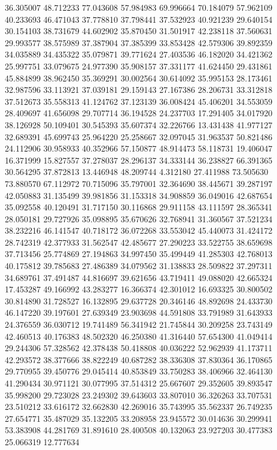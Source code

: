 36.305007
48.712233
77.043608
57.984983
69.996664
70.184079
57.962109
40.233693
46.471043
37.778810
37.798441
37.532923
40.921239
29.640154
30.154103
38.731679
44.602902
35.870450
31.501917
42.238118
37.560631
29.993577
38.575989
37.387904
37.385399
33.853428
42.579306
39.892359
34.035889
34.435322
35.079871
39.771624
27.403536
46.182020
34.421362
25.997751
33.079675
24.977390
35.908157
37.331177
41.624450
29.431861
45.884899
38.962450
35.369291
30.002564
30.614092
35.995153
28.173461
32.987596
33.113921
37.039181
29.159143
27.167386
28.206731
33.312818
37.512673
35.558313
41.124762
37.123139
36.008424
45.406201
34.553059
28.409697
41.656098
29.707714
36.194528
24.237703
17.291405
34.017920
38.126928
50.109401
30.545393
35.607374
32.226766
13.431438
41.977127
32.689391
45.699743
25.964220
25.258667
32.097045
31.963537
50.821486
24.112906
30.958933
40.352966
57.150877
48.914473
58.118731
19.406047
16.371999
15.827557
37.278037
28.296137
34.333144
36.238827
66.391365
30.564295
37.872813
13.446948
48.209744
4.312180
27.411988
73.505630
73.880570
67.112972
70.715096
35.797001
32.364690
38.445671
39.287197
42.050883
31.135499
39.981856
31.153318
34.908859
36.049016
42.687654
35.092558
40.120491
31.717150
30.116868
29.911158
43.111597
28.365341
28.050181
29.727926
35.098895
35.670626
32.768941
31.360567
37.521234
38.232216
46.141547
40.718172
36.072268
33.553042
45.440073
31.424172
28.742319
42.377933
31.562547
42.485677
27.290223
33.522755
38.659698
37.713456
25.774869
27.194863
34.997450
35.499449
41.285303
42.768013
40.175812
39.785683
27.486389
34.079562
31.138833
28.509822
37.297311
34.689761
37.491487
44.816697
39.621656
43.719411
49.088020
42.665324
17.453287
49.166992
43.283277
16.366374
42.301012
16.693325
30.800502
30.814890
31.728527
16.132895
29.637728
20.346146
48.892698
24.433730
46.147220
39.197601
27.639349
23.903698
44.591808
33.791989
31.643933
24.376559
36.030712
19.741489
56.341942
21.745844
30.209258
23.743149
42.460513
40.176383
48.502320
46.250380
41.316440
57.654300
41.049414
29.244306
57.328562
42.378438
50.418808
40.036222
52.962939
41.173711
42.293572
38.377666
38.822249
40.687282
38.336308
37.830364
36.170865
29.770955
39.450776
29.045414
40.853849
33.750283
38.406966
32.464130
41.290434
30.971121
30.077995
37.514312
25.667607
29.352605
39.893547
35.998200
29.723028
23.249302
39.643603
33.807010
36.326263
33.707531
23.510212
33.616172
32.662830
42.269016
35.743995
35.562337
26.749235
27.654771
35.487029
35.132205
33.208958
23.945572
30.014636
30.299941
53.383908
44.281769
31.891610
28.400508
40.132063
23.927203
30.477383
25.066319
12.777634
